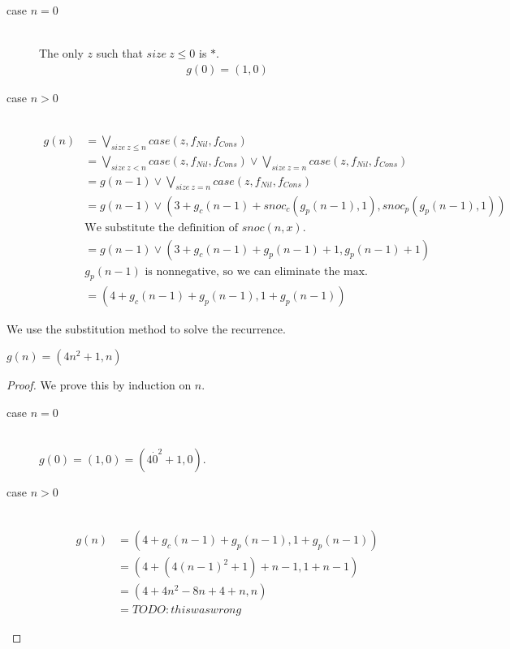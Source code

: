 \begin{description}
  \item[case $n=0$]\hfill \\
    The only $z$ such that $size\ z \leq 0$ is $\ast$.
    \begin{align*}
      g(0) = (1, 0)
    \end{align*}
  \item[case $n>0$]\hfill \\
    \begin{align*}
      g(n) &= \bigvee\limits_{size\ z \leq n} case(z, f_{Nil}, f_{Cons}) \\
           &= \bigvee\limits_{size\ z < n} case(z, f_{Nil}, f_{Cons}) \vee \bigvee\limits_{size\ z = n} case(z, f_{Nil}, f_{Cons}) \\
           &= g(n-1) \vee \bigvee\limits_{size\ z = n} case(z, f_{Nil}, f_{Cons}) \\
           &= g(n-1) \vee (3 + g_c(n-1) + snoc_c(g_p(n-1), 1), snoc_p(g_p(n-1), 1)) \\
           &\text{We substitute the definition of $snoc(n, x)$.} \\
           &= g(n-1) \vee (3 + g_c(n-1) + g_p(n-1) + 1, g_p(n-1) + 1) \\
           &\text{$g_p(n-1)$ is nonnegative, so we can eliminate the max.} \\
           &= (4 + g_c(n-1) + g_p(n-1), 1 + g_p(n-1))
    \end{align*}
\end{description}
%
We use the substitution method to solve the recurrence.
\begin{lemma}
  $g(n) = (4n^2 + 1, n)$
\end{lemma}
\begin{proof}
  We prove this by induction on $n$.
  \begin{description}
    \item[case $n=0$]\hfill \\
      $g(0) = (1, 0) = (4\dot0^2 + 1, 0)$.
    \item[case $n>0$]\hfill \\
      \begin{align*}
        g(n) &= (4 + g_c(n-1) + g_p(n-1), 1 + g_p(n-1)) \\
             &= (4 + (4(n-1)^2 + 1) + n - 1, 1 + n - 1) \\
             &= (4 + 4n^2 - 8n + 4 + n, n) \\
             &=TODO: this was wrong
      \end{align*}
  \end{description}
\end{proof}
